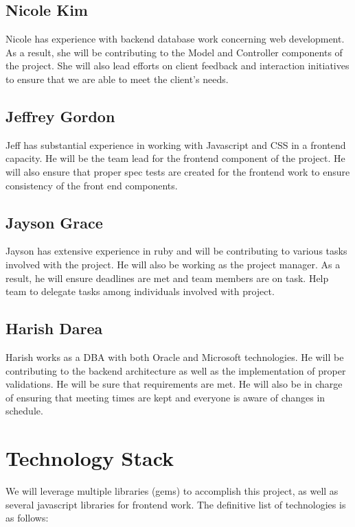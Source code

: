 \documentclass[12pt, a4paper, oneside]{article}
\begin{document}
\subsection*{Nicole Kim}
Nicole has experience with backend database work concerning web development. As a result, she will be contributing to the Model and Controller components of the project. She will also lead efforts on client feedback and interaction initiatives to ensure that we are able to meet the client's needs.

\subsection*{Jeffrey Gordon}
Jeff has substantial experience in working with Javascript and CSS in a frontend capacity. He will be the team lead for the frontend component of the project. He will also ensure that proper spec tests are created for the frontend work to ensure consistency of the front end components.

\subsection*{Jayson Grace}
Jayson has extensive experience in ruby and will be contributing to various tasks involved with the project. He will also be working as the project manager. As a result, he will ensure deadlines are met and team members are on task. Help team to delegate tasks among individuals involved with project. 

\subsection*{Harish Darea}
Harish works as a DBA with both Oracle and Microsoft technologies. He will be contributing to the backend architecture as well as the implementation of proper validations. He will be sure that requirements are met. He will also be in charge of ensuring that meeting times are kept and everyone is aware of changes in schedule.   

\section*{Technology Stack}
We will leverage multiple libraries (gems) to accomplish this project, as well as several javascript libraries for frontend work. The definitive list of technologies is as follows: \\
\end{document}
